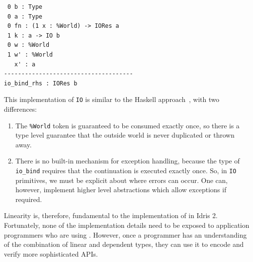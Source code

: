 \begin{lstlisting}
 0 b : Type
 0 a : Type
 0 fn : (1 x : %World) -> IORes a
 1 k : a -> IO b
 0 w : %World
 1 w' : %World
   x' : a
-------------------------------------
io_bind_rhs : IORes b
\end{lstlisting}

This implementation of \texttt{IO} is similar to the Haskell
approach~\cite{awkward}, with two differences:

\begin{enumerate}
\item The \texttt{\%World} token is guaranteed to be consumed exactly once, so
there is a type level guarantee that the outside world is never duplicated or
thrown away.
\item There is no built-in mechanism for exception handling, because the
type of \texttt{io\_bind} requires that the continuation is executed
exactly once. So, in \texttt{IO} primitives, we must be explicit about
where errors can occur. One can, however, implement higher level abstractions
which allow exceptions if required.
\end{enumerate}

Linearity is, therefore, fundamental to the implementation of  in
Idris 2. Fortunately, none of the implementation details need to be exposed
to application programmers who are using .
However, once a programmer has an understanding of the combination of linear
and dependent types, they can use it to encode and verify more sophisticated
APIs. %
